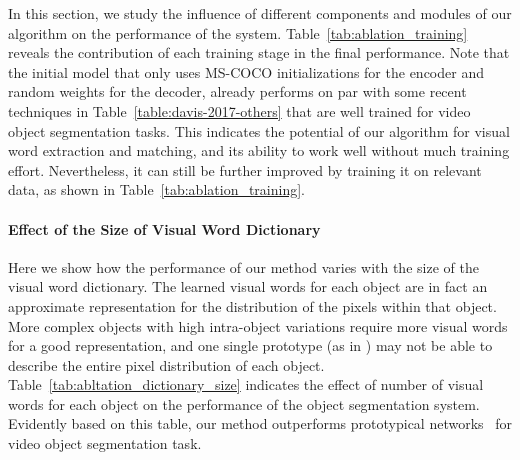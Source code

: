 \documentclass[10pt,twocolumn,letterpaper]{article}
\begin{document}
In this section, we study the influence of different components and modules of our algorithm on the performance of the system.%
Table~\ref{tab:ablation_training} reveals the contribution of each training stage in the final performance. Note that the initial model that only uses MS-COCO initializations for the encoder and random weights for the decoder, already performs on par with some recent techniques in Table~\ref{table:davis-2017-others} that are well trained for video object segmentation tasks. This indicates the potential of our algorithm for visual word extraction and matching, and its ability to work well without much training effort. Nevertheless, it can still be further improved by training it on relevant data, as shown in Table~\ref{tab:ablation_training}.
\vspace{-0.2in}\paragraph{Effect of the Size of Visual Word Dictionary}
Here we show how the performance of our method varies with the size of the visual word dictionary. The learned visual words for each object are in fact an approximate representation for the distribution of the pixels within that object. More complex objects with high intra-object variations require more visual words for a good representation, and one single prototype (as in \cite{NIPS2017_6996}) may not be able to describe the entire pixel distribution of each object. Table~\ref{tab:abltation_dictionary_size} indicates the effect of number of visual words for each object on the performance of the object segmentation system. Evidently based on this table, our method outperforms prototypical networks~\cite{NIPS2017_6996} for video object segmentation task. 
\end{document}
